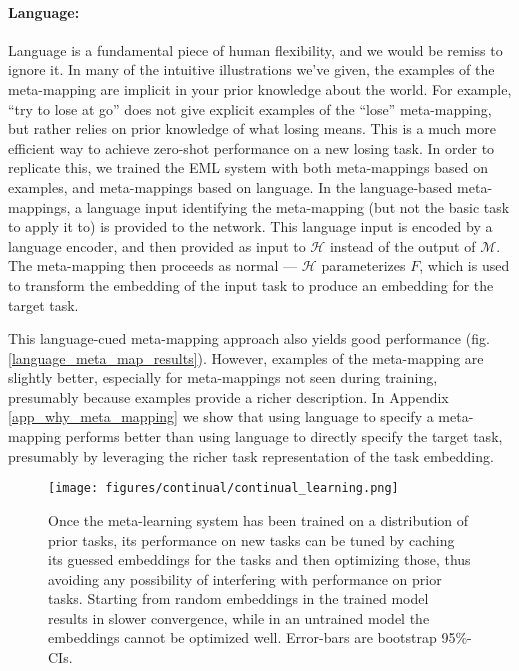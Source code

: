 \documentclass{article}
\begin{document}
\paragraph{Language:} Language is a fundamental piece of human flexibility, and we would be remiss to ignore it. In many of the intuitive illustrations we've given, the examples of the meta-mapping are implicit in your prior knowledge about the world. For example, ``try to lose at go'' does not give explicit examples of the ``lose'' meta-mapping, but rather relies on prior knowledge of what losing means. This is a much more efficient way to achieve zero-shot performance on a new losing task. In order to replicate this, we trained the EML system with both meta-mappings based on examples, and meta-mappings based on language. In the language-based meta-mappings, a language input identifying the meta-mapping (but not the basic task to apply it to) is provided to the network. This language input is encoded by a language encoder, and then provided as input to $\mathcal{H}$ instead of the output of $\mathcal{M}$. The meta-mapping then proceeds as normal --- $\mathcal{H}$ parameterizes $F$, which is used to transform the embedding of the input task to produce an embedding for the target task. \par
This language-cued meta-mapping approach also yields good performance (fig. \ref{language_meta_map_results}). However, examples of the meta-mapping are slightly better, especially for meta-mappings not seen during training, presumably because examples provide a richer description. In Appendix \ref{app_why_meta_mapping} we show that using language to specify a meta-mapping performs better than using language to directly specify the target task, presumably by leveraging the richer task representation of the task embedding. \par

\begin{figure}
\centering
\texttt{[image: figures/continual/continual\_learning.png]}
\caption{Once the meta-learning system has been trained on a distribution of prior tasks, its performance on new tasks can be tuned by caching its guessed embeddings for the tasks and then optimizing those, thus avoiding any possibility of interfering with performance on prior tasks. Starting from random embeddings in the trained model results in slower convergence, while in an untrained model the embeddings cannot be optimized well. Error-bars are bootstrap 95\%-CIs.}
\label{poly_continual_results}
\end{figure}
\vspace{-0.7em}
\end{document}
